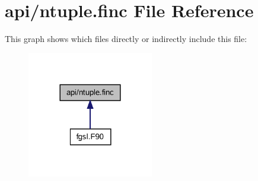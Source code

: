 \hypertarget{ntuple_8finc}{}\section{api/ntuple.finc File Reference}
\label{ntuple_8finc}
This graph shows which files directly or indirectly include this file\+:\nopagebreak
\begin{figure}[H]
\begin{center}
\leavevmode
\includegraphics[width=156pt]{ntuple_8finc__dep__incl}
\end{center}
\end{figure}
